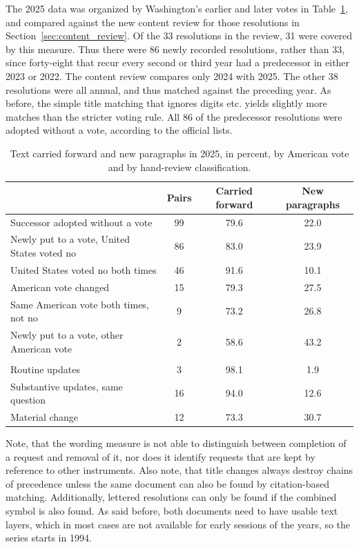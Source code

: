 \documentclass[10pt,authoryear]{elsarticle}
\begin{document}
The 2025 data was organized by Washington’s earlier and later votes in Table~\ref{tab:text_reuse_votes}, and compared against the new content review for those resolutions in Section~\ref{sec:content_review}. Of the 33 resolutions in the review, 31 were covered by this measure. Thus there were 86 newly recorded resolutions, rather than 33, since forty-eight that recur every second or third year had a predecessor in either 2023 or 2022. The content review compares only 2024 with 2025. The other 38 resolutions were all annual, and thus matched against the preceding year. As before, the simple title matching that ignores digits etc. yields slightly more matches than the stricter voting rule. All 86 of the predecessor resolutions were adopted without a vote, according to the official lists.

\begin{table}[ht]
\centering\small
\caption{Text carried forward and new paragraphs in 2025, in percent, by American vote and by hand-review classification.}
\label{tab:text_reuse_votes}
\begin{tabular}{lccc}
\toprule
 & Pairs & Carried forward & New paragraphs \\
\midrule
Successor adopted without a vote & 99 & 79.6 & 22.0 \\
Newly put to a vote, United States voted no & 86 & 83.0 & 23.9 \\
United States voted no both times & 46 & 91.6 & 10.1 \\
American vote changed & 15 & 79.3 & 27.5 \\
Same American vote both times, not no & 9 & 73.2 & 26.8 \\
Newly put to a vote, other American vote & 2 & 58.6 & 43.2 \\
\addlinespace
\multicolumn{4}{l}{\textit{Text-reviewed newly recorded resolutions}} \\
Routine updates & 3 & 98.1 & 1.9 \\
Substantive updates, same question & 16 & 94.0 & 12.6 \\
Material change & 12 & 73.3 & 30.7 \\
\bottomrule
\end{tabular}
\end{table}

Note, that the wording measure is not able to distinguish between completion of a request and removal of it, nor does it identify requests that are kept by reference to other instruments. Also note, that title changes always destroy chains of precedence unless the same document can also be found by citation-based matching. Additionally, lettered resolutions can only be found if the combined symbol is also found. As said before, both documents need to have usable text layers, which in most cases are not available for early sessions of the years, so the series starts in 1994.
\end{document}
